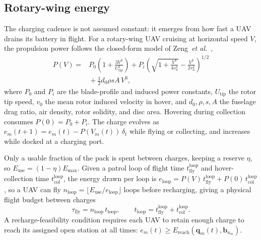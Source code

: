 \subsection{Rotary-wing energy}
\label{subsec:energy}
The charging cadence is not assumed constant: it emerges from how fast a UAV
drains its battery in flight. For a rotary-wing UAV cruising at horizontal speed
$V$, the propulsion power follows the closed-form model of Zeng~\emph{et
al.}~\cite{zeng2019energy},
\begin{equation}
\begin{split}
  P(V) = {}& P_0\!\left(1+\frac{3V^2}{U_{\mathrm{tip}}^2}\right)
       + P_i\!\left(\sqrt{1+\frac{V^4}{4v_0^4}}-\frac{V^2}{2v_0^2}\right)^{\!1/2}\\
       &{}+ \tfrac{1}{2}d_0\rho s A\,V^3,
\end{split}
  \label{eq:power}
\end{equation}
where $P_0$ and $P_i$ are the blade-profile and induced power constants,
$U_{\mathrm{tip}}$ the rotor tip speed, $v_0$ the mean rotor induced velocity in
hover, and $d_0,\rho,s,A$ the fuselage drag ratio, air density, rotor solidity,
and disc area. Hovering during collection consumes $P(0)=P_0+P_i$. The charge
evolves as $e_m(t+1)=e_m(t)-P(V_m(t))\,\delta_t$ while flying or collecting, and
increases while docked at a charging port.

Only a usable fraction of the pack is spent between charges, keeping a reserve
$\eta$, so $E_{\mathrm{use}}=(1-\eta)E_{\max}$. Given a patrol loop of flight
time $t_{\mathrm{fly}}^{\mathrm{loop}}$ and hover-collection time
$t_{\mathrm{col}}^{\mathrm{loop}}$, the energy drawn per loop is
$e_{\mathrm{loop}} = P(V)\,t_{\mathrm{fly}}^{\mathrm{loop}}
+ P(0)\,t_{\mathrm{col}}^{\mathrm{loop}}$, so a UAV can fly
$n_{\mathrm{loop}}=\lfloor E_{\mathrm{use}}/e_{\mathrm{loop}}\rfloor$ loops before
recharging, giving a physical flight budget between charges
\begin{equation}
  \tau_{\mathrm{fly}} = n_{\mathrm{loop}}\, t_{\mathrm{loop}},
  \qquad
  t_{\mathrm{loop}} = t_{\mathrm{fly}}^{\mathrm{loop}}+t_{\mathrm{col}}^{\mathrm{loop}}.
  \label{eq:taufly}
\end{equation}
A recharge-feasibility condition requires each UAV to retain enough charge to
reach its assigned open station at all times:
$e_m(t)\ge E_{\mathrm{reach}}(\mathbf{q}_m(t),\mathbf{b}_{a_m})$.

